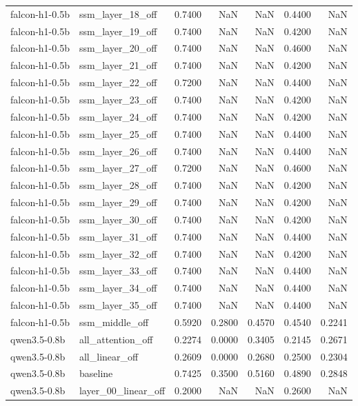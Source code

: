 \begin{tabular}{llrrrrr}
falcon-h1-0.5b & ssm_layer_18_off & 0.7400 & NaN & NaN & 0.4400 & NaN \\
falcon-h1-0.5b & ssm_layer_19_off & 0.7400 & NaN & NaN & 0.4200 & NaN \\
falcon-h1-0.5b & ssm_layer_20_off & 0.7400 & NaN & NaN & 0.4600 & NaN \\
falcon-h1-0.5b & ssm_layer_21_off & 0.7400 & NaN & NaN & 0.4200 & NaN \\
falcon-h1-0.5b & ssm_layer_22_off & 0.7200 & NaN & NaN & 0.4400 & NaN \\
falcon-h1-0.5b & ssm_layer_23_off & 0.7400 & NaN & NaN & 0.4200 & NaN \\
falcon-h1-0.5b & ssm_layer_24_off & 0.7400 & NaN & NaN & 0.4200 & NaN \\
falcon-h1-0.5b & ssm_layer_25_off & 0.7400 & NaN & NaN & 0.4400 & NaN \\
falcon-h1-0.5b & ssm_layer_26_off & 0.7400 & NaN & NaN & 0.4400 & NaN \\
falcon-h1-0.5b & ssm_layer_27_off & 0.7200 & NaN & NaN & 0.4600 & NaN \\
falcon-h1-0.5b & ssm_layer_28_off & 0.7400 & NaN & NaN & 0.4200 & NaN \\
falcon-h1-0.5b & ssm_layer_29_off & 0.7400 & NaN & NaN & 0.4200 & NaN \\
falcon-h1-0.5b & ssm_layer_30_off & 0.7400 & NaN & NaN & 0.4200 & NaN \\
falcon-h1-0.5b & ssm_layer_31_off & 0.7400 & NaN & NaN & 0.4400 & NaN \\
falcon-h1-0.5b & ssm_layer_32_off & 0.7400 & NaN & NaN & 0.4200 & NaN \\
falcon-h1-0.5b & ssm_layer_33_off & 0.7400 & NaN & NaN & 0.4400 & NaN \\
falcon-h1-0.5b & ssm_layer_34_off & 0.7400 & NaN & NaN & 0.4400 & NaN \\
falcon-h1-0.5b & ssm_layer_35_off & 0.7400 & NaN & NaN & 0.4400 & NaN \\
falcon-h1-0.5b & ssm_middle_off & 0.5920 & 0.2800 & 0.4570 & 0.4540 & 0.2241 \\
qwen3.5-0.8b & all_attention_off & 0.2274 & 0.0000 & 0.3405 & 0.2145 & 0.2671 \\
qwen3.5-0.8b & all_linear_off & 0.2609 & 0.0000 & 0.2680 & 0.2500 & 0.2304 \\
qwen3.5-0.8b & baseline & 0.7425 & 0.3500 & 0.5160 & 0.4890 & 0.2848 \\
qwen3.5-0.8b & layer_00_linear_off & 0.2000 & NaN & NaN & 0.2600 & NaN \\

\end{tabular}
